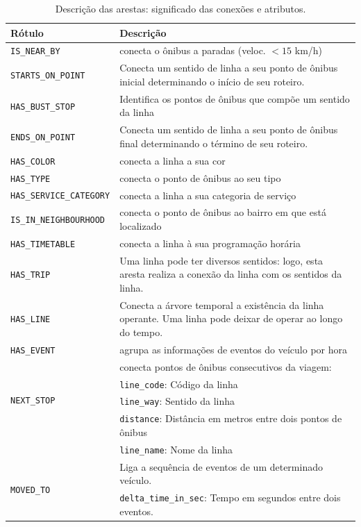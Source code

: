 \begin{table}[!htb]
    \caption{Descrição das arestas: significado das conexões e atributos.}
    \label{tab:arestas}
    \centering
    \small
    \begin{tabular}{ p{5cm}p{8.5cm}} 
    \hline
    Rótulo & Descrição\\
    \hline
    \texttt{IS\_NEAR\_BY}            & conecta o ônibus a paradas (veloc. $< 15$ km/h)\\
    \texttt{STARTS\_ON\_POINT}       & Conecta um sentido de linha a seu ponto de ônibus inicial determinando o início de seu roteiro. \\
    \texttt{HAS\_BUST\_STOP}         & Identifica os pontos de ônibus que compõe um sentido da linha\\
    \texttt{ENDS\_ON\_POINT}         & Conecta um sentido de linha a seu ponto de ônibus final determinando o término de seu roteiro. \\
    \texttt{HAS\_COLOR}              & conecta a linha a sua cor \\ 
    \texttt{HAS\_TYPE}               & conecta o ponto de ônibus ao seu tipo \\ 
    \texttt{HAS\_SERVICE\_CATEGORY}  & conecta a linha a sua categoria de serviço \\ 
    \texttt{IS\_IN\_NEIGHBOURHOOD}   & conecta o ponto de ônibus ao bairro em que está localizado \\ 
    \texttt{HAS\_TIMETABLE}          & conecta a linha à sua programação horária \\ 
    \texttt{HAS\_TRIP}               &  Uma linha pode ter diversos sentidos: logo, esta aresta realiza a conexão da linha com os sentidos da linha. \\ 
    \texttt{HAS\_LINE}               & Conecta a árvore temporal a existência da linha operante. Uma linha pode deixar de operar ao longo do tempo. \\ 
    \texttt{HAS\_EVENT}              & agrupa as informações de eventos do veículo por hora\\
    \hline
    \multirow{4}{*}{\texttt{NEXT\_STOP}} & conecta pontos de ônibus consecutivos da viagem: \\
    & \texttt{line\_code}: Código da linha\\
    & \texttt{line\_way}: Sentido da linha\\
    & \texttt{distance}: Distância em metros entre dois pontos de ônibus \\
    & \texttt{line\_name}: Nome da linha\\
    \hline
    \multirow{4}{*}{\texttt{MOVED\_TO}}           & Liga a sequência de eventos de um determinado veículo. \\
    & \texttt{delta\_time\_in\_sec}: Tempo em segundos entre dois eventos.\\
    \hline
    \end{tabular}
\end{table}




